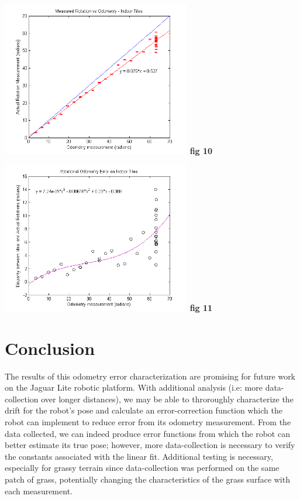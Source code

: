 \documentclass[conference]{IEEEtran}
\begin{document}
\includegraphics[width=3.25in]{tiles_rotation.png}
\textbf{fig 10}



\includegraphics[width=3.25in]{tiles_rotation_error.png}
\textbf{fig 11}

\section{Conclusion}
The results of this odometry error characterization are promising for future 
work on the Jaguar Lite robotic platform.  With additional 
analysis (i.e: more data-collection over longer distances), we may be able 
to throroughly characterize the drift for the robot's pose and calculate an
error-correction function which the robot can implement to reduce 
error from its odometry measurement. From the data collected, we can 
indeed produce error functions from which the robot can better estimate its 
true pose; however, more data-collection is necessary to verify the constants 
associated with the linear fit.  Additional testing is necessary, especially for grassy terrain since data-collection was performed on the same patch of grass, 
potentially changing the characteristics of the grass surface with each 
measurement.
\end{document}
